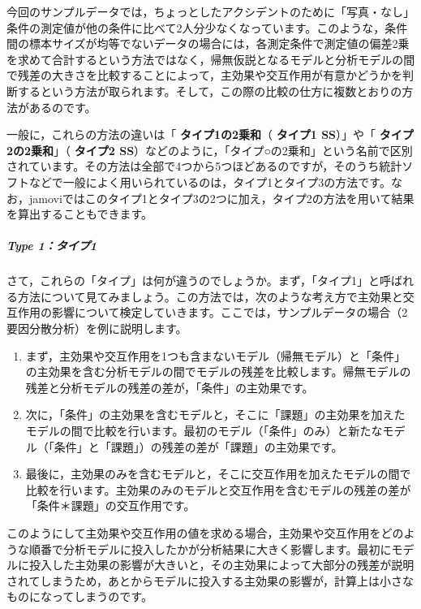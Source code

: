 \documentclass[
  12pt,
  a5jpaper,
  lualatex, ja=standard]{bxjsbook}
\renewcommand{\emph}[1]{\textbf{\color{emph} #1}}
\begin{document}
今回のサンプルデータでは，ちょっとしたアクシデントのために「写真・なし」条件の測定値が他の条件に比べて2人分少なくなっています。このような，条件間の標本サイズが均等でないデータの場合には，各測定条件で測定値の偏差2乗を求めて合計するという方法ではなく，帰無仮説となるモデルと分析モデルの間で残差の大きさを比較することによって，主効果や交互作用が有意かどうかを判断するという方法が取られます。そして，この際の比較の仕方に複数とおりの方法があるのです。

一般に，これらの方法の違いは「\emph{タイプ1の2乗和}（\emph{タイプ1 SS}）」や「\emph{タイプ2の2乗和}」（\emph{タイプ2 SS}）などのように，「タイプ○の2乗和」という名前で区別されています。その方法は全部で4つから5つほどあるのですが，そのうち統計ソフトなどで一般によく用いられているのは，タイプ1とタイプ3の方法です。なお，jamoviではこのタイプ1とタイプ3の2つに加え，タイプ2の方法を用いて結果を算出することもできます。

\hypertarget{type-1ux30bfux30a4ux30d71}{%
\subparagraph*{Type 1：タイプ1}\label{type-1ux30bfux30a4ux30d71}}

さて，これらの「タイプ」は何が違うのでしょうか。まず，「タイプ1」と呼ばれる方法について見てみましょう。この方法では，次のような考え方で主効果と交互作用の影響について検定していきます。ここでは，サンプルデータの場合（2要因分散分析）を例に説明します。

\begin{enumerate}
\def\labelenumi{\arabic{enumi}.}
\item
  まず，主効果や交互作用を1つも含まないモデル（帰無モデル）と「条件」の主効果を含む分析モデルの間でモデルの残差を比較します。帰無モデルの残差と分析モデルの残差の差が，「条件」の主効果です。
\item
  次に，「条件」の主効果を含むモデルと，そこに「課題」の主効果を加えたモデルの間で比較を行います。最初のモデル（「条件」のみ）と新たなモデル（「条件」と「課題」）の残差の差が「課題」の主効果です。
\item
  最後に，主効果のみを含むモデルと，そこに交互作用を加えたモデルの間で比較を行います。主効果のみのモデルと交互作用を含むモデルの残差の差が「条件＊課題」の交互作用です。
\end{enumerate}

このようにして主効果や交互作用の値を求める場合，主効果や交互作用をどのような順番で分析モデルに投入したかが分析結果に大きく影響します。最初にモデルに投入した主効果の影響が大きいと，その主効果によって大部分の残差が説明されてしまうため，あとからモデルに投入する主効果の影響が，計算上は小さなものになってしまうのです。
\end{document}
